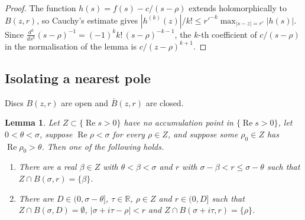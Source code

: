 \documentclass[11pt]{amsart}
\newcommand{\R}{\mathbb{R}}
\newcommand{\re}{\operatorname{Re}}
\theoremstyle{plain}
\newtheorem{lemma}[theorem]{Lemma}
\theoremstyle{definition}
\numberwithin{equation}{section}
\begin{document}
\begin{proof}
The function $h(s)=f(s)-c/(s-\rho)$ extends holomorphically to $B(z,r)$, so Cauchy's estimate gives
$|h^{(k)}(z)|/k!\le r'^{-k}\max_{|s-z|=r'}|h(s)|$. Since
$\frac{d^k}{ds^k}(s-\rho)^{-1}=(-1)^kk!\,(s-\rho)^{-k-1}$, the $k$-th coefficient of $c/(s-\rho)$
in the normalisation of the lemma is $c/(z-\rho)^{k+1}$.
\end{proof}

\subsection{Isolating a nearest pole}

Discs $B(z,r)$ are open and $\bar B(z,r)$ are closed.

\begin{lemma}\label{lem:nearest}
Let $Z\subset\{\re s>0\}$ have no accumulation point in $\{\re s>0\}$, let $0<\theta<\sigma$,
suppose $\re\rho<\sigma$ for every $\rho\in Z$, and suppose some $\rho_0\in Z$ has
$\re\rho_0>\theta$. Then one of the following holds.
\begin{enumerate}[label=(\Roman*)]
\item There are a real $\beta\in Z$ with $\theta<\beta<\sigma$ and $r$ with $\sigma-\beta<r\le\sigma-\theta$
  such that $Z\cap B(\sigma,r)=\{\beta\}$.
\item There are $D\in(0,\sigma-\theta]$, $\tau\in\R$, $\rho\in Z$ and $r\in(0,D]$ such that
  $Z\cap B(\sigma,D)=\emptyset$, $|\sigma+i\tau-\rho|<r$ and $Z\cap B(\sigma+i\tau,r)=\{\rho\}$.
\end{enumerate}
\end{lemma}
\end{document}

